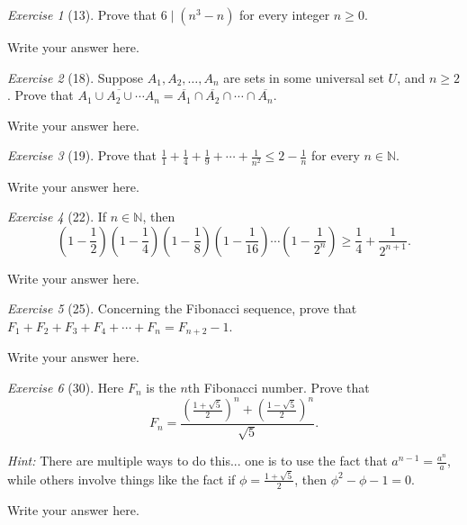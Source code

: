 \documentclass[12pt]{amsart}
\makeatletter
\theoremstyle{remark}
\newtheorem*{exercise}{Exercise}%
\def\NN{\ensuremath{\mathbb N}}
\renewenvironment{proof}[1][\proofname]{\par\doublespacing
  \pushQED{\qed}%
  \normalfont \topsep6\p@\@plus6\p@\relax
  \list{}{%
    \settowidth{\leftmargin}{\itshape\proofname:\hskip\labelsep}%
    \setlength{\labelwidth}{0pt}%
    \setlength{\itemindent}{-\leftmargin}%
  }%
  \item[\hskip\labelsep\itshape#1\@addpunct{:}]\ignorespaces
}{%
  \popQED\endlist\@endpefalse
  \singlespacing
}
\theoremstyle{mycomment}
\makeatother
\begin{document}
\begin{exercise}[13] Prove that $6\mid(n^{3}-n)$ for every integer $n\ge 0$.
\begin{proof}
Write your answer here.
\end{proof}
\end{exercise}

\begin{exercise}[18] Suppose $A_{1},A_{2},\ldots, A_{n}$ are sets in some universal set $U$, and $n\ge 2$. Prove that $\overline{A_{1}\cup A_{2}\cup \cdots A_{n}}=\overline{A_{1}}\cap\overline{A_{2}}\cap\cdots \cap\overline{A_{n}}$.
\begin{proof}
Write your answer here.
\end{proof}
\end{exercise}

\begin{exercise}[19] Prove that $\displaystyle \frac{1}{1}+\frac{1}{4}+\frac{1}{9}+\cdots+\frac{1}{n^{2}}\le 2-\frac{1}{n}$ for every $n\in\NN$.
\begin{proof}
Write your answer here.
\end{proof}
\end{exercise}

\begin{exercise}[22] If $n\in\NN$, then $$\left(1-\frac{1}{2}\right)\left(1-\frac{1}{4}\right)\left(1-\frac{1}{8}\right)\left(1-\frac{1}{16}\right)\cdots\left(1-\frac{1}{2^{n}}\right)\ge \frac{1}{4}+\frac{1}{2^{n+1}}.$$
\begin{proof}
Write your answer here.
\end{proof}
\end{exercise}

\begin{exercise}[25] Concerning the Fibonacci sequence, prove that $F_{1}+F_{2}+F_{3}+F_{4}+\cdots+F_{n}=F_{n+2}-1$.
\begin{proof}
Write your answer here.
\end{proof}
\end{exercise}


\begin{exercise}[30] Here $F_{n}$ is the $n$th Fibonacci number. Prove that $$F_{n}=\frac{\left(\frac{1+\sqrt{5}}{2}\right)^{n}+\left(\frac{1-\sqrt{5}}{2}\right)^{n}}{\sqrt{5}}.$$

\emph{Hint:} There are multiple ways to do this... one is to use the fact that $a^{n-1}=\frac{a^{n}}{a}$, while others involve things like the fact if $\phi=\frac{1+\sqrt{5}}{2}$, then $\phi^{2}-\phi-1=0$.
\begin{proof}
Write your answer here.
\end{proof}
\end{exercise}
\end{document}
